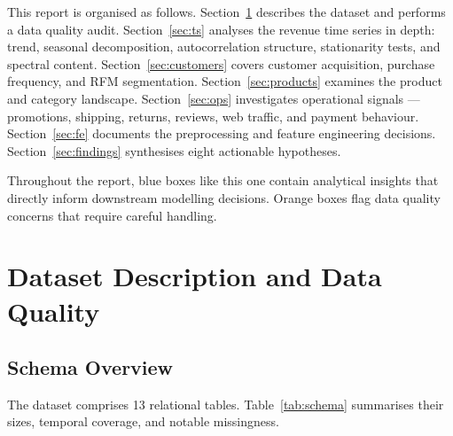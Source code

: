 \documentclass{article}
\begin{document}
This report is organised as follows.
Section~\ref{sec:data} describes the dataset and performs a data quality audit.
Section~\ref{sec:ts} analyses the revenue time series in depth: trend, seasonal
decomposition, autocorrelation structure, stationarity tests, and spectral
content.
Section~\ref{sec:customers} covers customer acquisition, purchase frequency, and
RFM segmentation.
Section~\ref{sec:products} examines the product and category landscape.
Section~\ref{sec:ops} investigates operational signals — promotions, shipping,
returns, reviews, web traffic, and payment behaviour.
Section~\ref{sec:fe} documents the preprocessing and feature engineering
decisions.
Section~\ref{sec:findings} synthesises eight actionable hypotheses.

\begin{insightbox}
Throughout the report, blue boxes like this one contain analytical insights
that directly inform downstream modelling decisions.
Orange boxes flag data quality concerns that require careful handling.
\end{insightbox}

\section{Dataset Description and Data Quality}
\label{sec:data}

\subsection{Schema Overview}

The dataset comprises 13 relational tables.
Table~\ref{tab:schema} summarises their sizes, temporal coverage, and notable
missingness.
\end{document}
